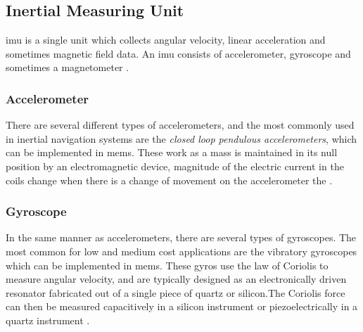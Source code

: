 \subsection{Inertial Measuring Unit}
\acrfull{imu} is a single unit which collects angular velocity, linear acceleration and sometimes magnetic field data. An \acrshort{imu} consists of accelerometer, gyroscope and sometimes a magnetometer \cite{vik}. 

\subsubsection{Accelerometer}
There are several different types of accelerometers, and the most commonly used in inertial navigation systems are the \textit{closed loop pendulous accelerometers}, which can be implemented in \acrfull{mems}. These work as a mass is maintained in its null position by an electromagnetic device, magnitude of the electric current in the coils change when there is a change of movement on the accelerometer the \cite{vik}.

\subsubsection{Gyroscope}
In the same manner as accelerometers, there are several types of gyroscopes. The most common for low and medium cost applications are the vibratory gyroscopes which can be implemented in \acrshort{mems}. These gyros use the law of Coriolis to measure angular velocity, and are typically designed as an electronically driven resonator fabricated out of a single piece of quartz or silicon.The Coriolis force can then be measured capacitively in a silicon instrument or piezoelectrically in a quartz instrument \cite{vik}.
\newpage